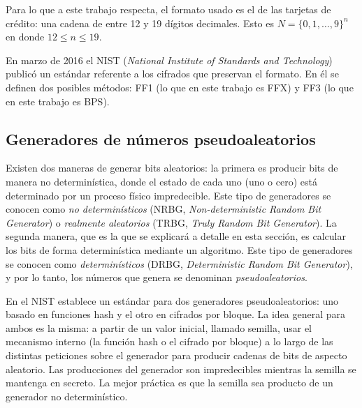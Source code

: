 
Para lo que a este trabajo respecta, el formato usado es el de las tarjetas de
crédito: una cadena de entre 12 y 19 dígitos decimales. Esto es $ N = \{0, 1,
\dots, 9\}^n $ en donde $ 12 \leq n \leq 19 $.


En marzo de 2016 el NIST (\textit{National Institute of Standards and
Technology}) publicó un estándar referente a los cifrados que preservan el
formato\cite{nist_fpe}. En él se definen dos posibles métodos: FF1 (lo que en
este trabajo es FFX) y FF3 (lo que en este trabajo es BPS).


\subsection{Generadores de números pseudoaleatorios}

Existen dos maneras de generar bits aleatorios: la primera es producir bits de
manera no determinística, donde el estado de cada uno (uno o cero) está
determinado por un proceso físico impredecible. Este tipo de generadores se
conocen como \textit{no determinísticos} (NRBG, \textit{Non-deterministic Random
Bit Generator}) o \textit{realmente aleatorios} (TRBG, \textit{Truly Random Bit
Generator}). La segunda manera, que es la que se explicará a detalle en esta
sección, es calcular los bits de forma determinística mediante un algoritmo.
Este tipo de generadores se conocen como \textit{determinísticos} (DRBG,
\textit{Deterministic Random Bit Generator}), y por lo tanto, los números que
genera se denominan \textit{pseudoaleatorios}.

En \cite{nist_aleatorios} el NIST establece un estándar para dos generadores
pseudoaleatorios: uno basado en funciones hash y el otro en cifrados por bloque.
La idea general para ambos es la misma: a partir de un valor inicial, llamado
semilla, usar el mecanismo interno (la función hash o el cifrado por bloque) a
lo largo de las distintas peticiones sobre el generador para producir cadenas de
bits de aspecto aleatorio. Las producciones del generador son impredecibles
mientras la semilla se mantenga en secreto. La mejor práctica es que la semilla
sea producto de un generador no determinístico.

